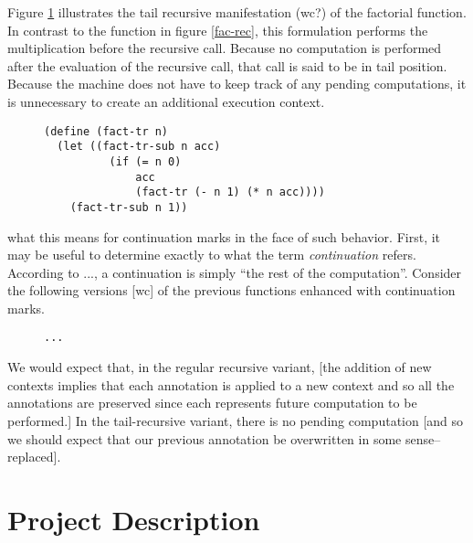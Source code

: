 \documentclass[ms]{byuprop}
\begin{document}
Figure \ref{fac-tail-rec} illustrates the tail recursive manifestation (wc?) of the factorial function. In contrast to the function in figure \ref{fac-rec}, this formulation performs the multiplication before the recursive call. Because no computation is performed after the evaluation of the recursive call, that call is said to be in tail position. Because the machine does not have to keep track of any pending computations, it is unnecessary to create an additional execution context.

\begin{figure}
\label{fac-tail-rec}
\begin{verbatim}
(define (fact-tr n)
  (let ((fact-tr-sub n acc)
          (if (= n 0)
              acc
              (fact-tr (- n 1) (* n acc))))
    (fact-tr-sub n 1))
\end{verbatim}
\end{figure}

what this means for continuation marks in the face of such behavior. 
First, it may be useful to determine exactly to what the term 
\emph{continuation} refers. According to ..., a continuation is simply 
``the rest of the computation''. Consider the following versions [wc] of 
the previous functions enhanced with continuation marks.

\begin{figure}
\label{fac-rec-cm}
\begin{verbatim}
...
\end{verbatim}
\end{figure}


We would expect that, in the regular recursive variant, [the addition of new contexts implies that each annotation is applied to a new context and so all the annotations are preserved since each represents future computation to be performed.] In the tail-recursive variant, there is no pending computation [and so we should expect that our previous annotation be overwritten in some sense--replaced].






\section{Project Description}
\end{document}
